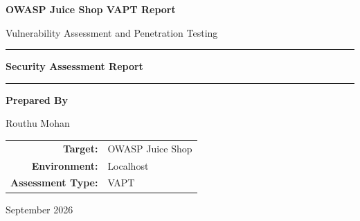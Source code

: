 \documentclass[11pt,a4paper]{report}
\begin{document}

\begin{titlepage}
    \centering

    \vspace*{1.5cm}

    {\Huge\bfseries\color{primary}
    OWASP Juice Shop VAPT Report\par}

    \vspace{0.5cm}

    {\Large
    Vulnerability Assessment and Penetration Testing\par}

    \vspace{1.2cm}

    \rule{\textwidth}{1pt}

    \vspace{0.4cm}

    {\large\bfseries Security Assessment Report\par}

    \vspace{0.4cm}

    \rule{\textwidth}{1pt}

    \vfill

    {\large\textbf{Prepared By}\par}

    \vspace{0.25cm}

    {\Large Routhu Mohan\par}

    \vspace{0.8cm}

    \begin{tabular}{rl}
        \textbf{Target:} & OWASP Juice Shop \\
        \textbf{Environment:} & Localhost \\
        \textbf{Assessment Type:} & VAPT
    \end{tabular}

    \vfill

    {\large September 2026 \par}

\end{titlepage}

\end{document}
